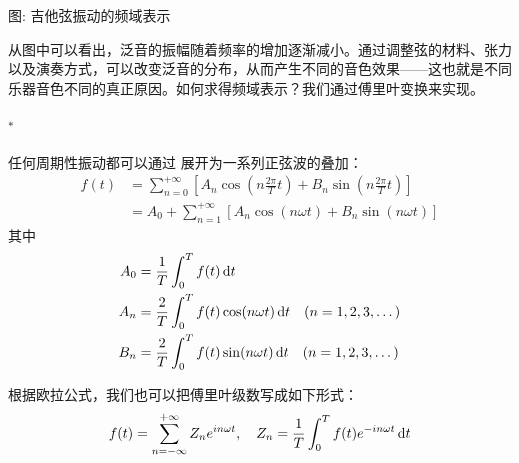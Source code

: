 \begin{center}
    \par
    图\thefigure: 吉他弦振动的频域表示
\end{center}

从图中可以看出，泛音的振幅随着频率的增加逐渐减小。通过调整弦的材料、张力以及演奏方式，可以改变泛音的分布，从而产生不同的音色效果——这也就是不同乐器音色不同的真正原因。如何求得频域表示？我们通过傅里叶变换来实现。

\subsubsection[傅里叶分析$^*$]{$^*$}

任何周期性振动都可以通过  展开为一系列正弦波的叠加：
\[
    \begin{aligned}
        f(t) & = \sum_{n=0}^{+\infty} \left[A_n \cos \left(n\frac{2\pi}{T} t\right)+B_n \sin \left(n\frac{2\pi}{T} t\right)\right] \\
             & = A_0 + \sum_{n=1}^{+\infty} \left[A_n \cos (n\omega t)+B_n \sin (n\omega t)\right]
    \end{aligned}
\]
其中
\[
    \begin{aligned}
        A_0 & =\frac{1}{T}\int^T_0f(t)\dif t                                            \\
        A_n & =\frac{2}{T}\int^T_0f(t)\cos (n\omega t)\dif t \quad (n = 1, 2, 3, \dots) \\
        B_n & =\frac{2}{T}\int^T_0f(t)\sin (n\omega t)\dif t \quad (n = 1, 2, 3, \dots)
    \end{aligned}
\]

根据欧拉公式，我们也可以把傅里叶级数写成如下形式：
\[
    f(t)=\sum_{n=-\infty}^{+\infty} Z_ne^{in\omega t},\quad Z_n=\frac{1}{T}\int^T_0 f(t)e^{-in\omega t}\dif t
\]

